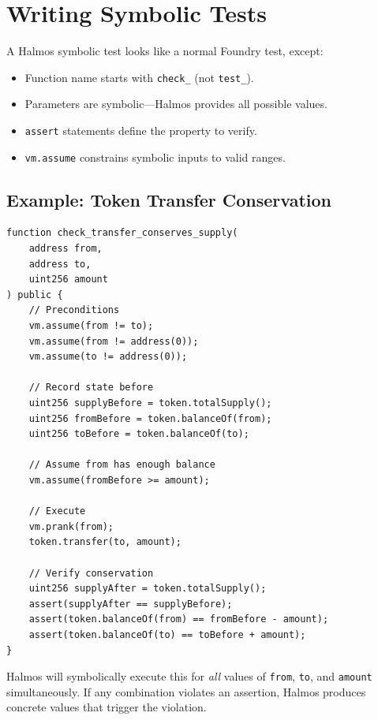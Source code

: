 \section{Writing Symbolic Tests}


A Halmos symbolic test looks like a normal Foundry test, except:
\begin{itemize}[nosep]
  \item Function name starts with \texttt{check\_} (not \texttt{test\_}).
  \item Parameters are symbolic---Halmos provides all possible values.
  \item \texttt{assert} statements define the property to verify.
  \item \texttt{vm.assume} constrains symbolic inputs to valid ranges.
\end{itemize}

\subsection{Example: Token Transfer Conservation}

\begin{lstlisting}[language=Solidity,caption={Symbolic test: total supply is conserved by transfers}]
function check_transfer_conserves_supply(
    address from,
    address to,
    uint256 amount
) public {
    // Preconditions
    vm.assume(from != to);
    vm.assume(from != address(0));
    vm.assume(to != address(0));

    // Record state before
    uint256 supplyBefore = token.totalSupply();
    uint256 fromBefore = token.balanceOf(from);
    uint256 toBefore = token.balanceOf(to);

    // Assume from has enough balance
    vm.assume(fromBefore >= amount);

    // Execute
    vm.prank(from);
    token.transfer(to, amount);

    // Verify conservation
    uint256 supplyAfter = token.totalSupply();
    assert(supplyAfter == supplyBefore);
    assert(token.balanceOf(from) == fromBefore - amount);
    assert(token.balanceOf(to) == toBefore + amount);
}
\end{lstlisting}

Halmos will symbolically execute this for \emph{all} values of \texttt{from},
\texttt{to}, and \texttt{amount} simultaneously. If any combination violates an
assertion, Halmos produces concrete values that trigger the violation.

